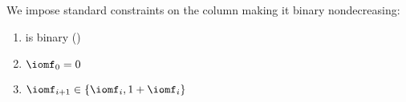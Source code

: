 We impose standard constraints on the \iomf{} column making it binary nondecreasing:
\begin{enumerate}
	\item \iomf{} is binary \quad (\sanityCheck)
	\item $\iomf _{0} = 0$
	\item $\iomf _{i + 1} \in \{ \iomf _{i}, 1 + \iomf _{i} \}$
\end{enumerate}
